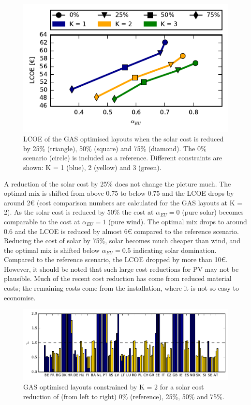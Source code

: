 \documentclass[a4paper, 5p, sort&compress]{elsarticle}%
\begin{document}
\begin{figure}[h!]
  \centering
  \includegraphics[width = \columnwidth]{solarAnalysis-new}
  \caption{LCOE of the GAS optimised layouts when the solar cost is
    reduced by 25\% (triangle), 50\% (square) and 75\% (diamond). The
    0\% scenario (circle) is included as a reference. Different
    constraints are shown: K = 1 (blue), 2 (yellow) and 3 (green).}
  \label{fig:red-solar}
\end{figure}

A reduction of the solar cost by 25\% does not change the picture
much. The optimal mix is shifted from above 0.75 to below 0.75 and the
LCOE drops by around 2\euro{} (cost comparison numbers are calculated
for the GAS layouts at K = 2).  As the solar cost is reduced by 50\%
the cost at $\alpha_{EU} = 0$ (pure solar) becomes comparable to the
cost at $\alpha_{EU} = 1$ (pure wind). The optimal mix drops to around
0.6 and the LCOE is reduced by almost 6\euro{} compared to the
reference scenario. Reducing the cost of solar by 75\%, solar becomes
much cheaper than wind, and the optimal mix is shifted below
$\alpha_{EU} = 0.5$ indicating solar domination. Compared to the
reference scenario, the LCOE dropped by more than 10\euro. However, it
should be noted that such large cost reductions for PV may not be
plausible. Much of the recent cost reduction  has come from reduced material costs; the remaining costs come from the installation, where it is not so easy to economise.

\begin{figure}[t!]
  \centering
  \includegraphics[width = 2\columnwidth, center]{solarAnalysis-layouts}
  \caption{GAS optimised layouts constrained by K = 2 for a solar cost
    reduction of (from left to right) 0\% (reference), 25\%, 50\% and
    75\%.}
  \label{fig:layout-offshore}
\end{figure}
\end{document}
